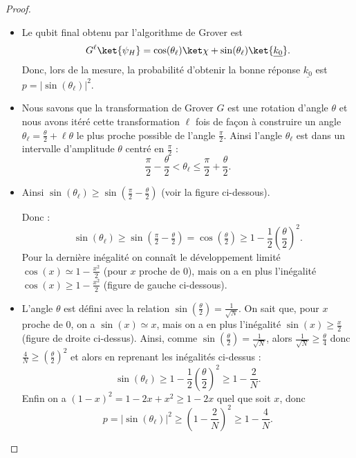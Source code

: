 \documentclass[11pt,class=report,crop=false]{standalone}
\begin{document}
\begin{proof}
~
\begin{itemize}
  \item Le qubit final obtenu par l'algorithme de Grover est
$$G^\ell\ket{\psi_H} = \cos(\theta_\ell) \ket\chi + \sin(\theta_\ell) \ket{\underline{k_0}}.$$
Donc, lors de la mesure, la probabilité d'obtenir la bonne réponse $\underline{k_0}$ est
$p = |\sin(\theta_\ell)|^2$.

  \item Nous savons que la transformation de Grover $G$ est une rotation d'angle $\theta$ et nous avons itéré cette transformation $\ell$ fois de façon à construire un angle $\theta_\ell = \frac\theta2+\ell\theta$ le plus proche possible de l'angle $\frac\pi2$.
Ainsi l'angle $\theta_\ell$ est dans un intervalle d'amplitude $\theta$ centré en $\frac\pi2$ :
$$\frac\pi2-\frac\theta2 < \theta_\ell \le \frac\pi2+\frac\theta2.$$

  \item Ainsi $\sin(\theta_\ell) \ge \sin \left( \frac\pi2-\frac\theta2 \right)$ (voir la figure ci-dessous).

Donc :
$$\sin(\theta_\ell) 
\ge \sin\left( \tfrac\pi2-\tfrac\theta2 \right)
= \cos\left( \tfrac\theta2 \right)
\ge 1 - \frac12\left(\frac\theta2\right)^2.$$
Pour la dernière inégalité on connaît le développement limité $\cos(x) \simeq 1 - \frac{x^2}{2}$ (pour $x$ proche de $0$), mais on a en plus l'inégalité $\cos(x) \ge 1 - \frac{x^2}{2}$ (figure de gauche ci-dessous).

\medskip


\medskip

  \item L'angle $\theta$ est défini avec la relation $\sin \left( \frac\theta2 \right) = \frac{1}{\sqrt{N}}$.
On sait que, pour $x$ proche de $0$, on a $\sin(x) \simeq x$, mais on a en plus
l'inégalité $\sin(x) \ge \frac x2$ (figure de droite ci-dessus). 
Ainsi, comme $\sin \left(\frac\theta2\right) = \frac{1}{\sqrt{N}}$, alors
$\frac{1}{\sqrt{N}} \ge \frac\theta4$ donc $\frac{4}{N} \ge \left( \frac\theta2 \right)^2$
et alors en reprenant les inégalités ci-dessus :
$$\sin(\theta_\ell) \ge 1 - \frac12\left(\frac\theta2\right)^2
\ge 1-\frac2N.$$
Enfin on a $(1-x)^2 = 1-2x+x^2 \ge 1-2x$ quel que soit $x$, donc
$$p = |\sin(\theta_\ell)|^2 \ge  \left(1-\frac2N\right)^2 \ge 1-\frac4N.$$

\end{itemize}
\end{proof}
\end{document}
